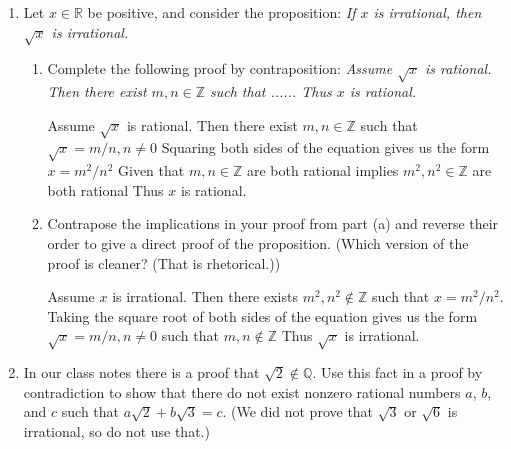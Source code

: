 \documentclass{article}
\newcommand{\bR}{\mathbb{R}}
\newcommand{\bQ}{\mathbb{Q}}
\newcommand{\bZ}{\mathbb{Z}}
\begin{document}
{\begin{enumerate}[labelindent=0pt,leftmargin=0pt]
\begin{enumerate}
Now we have the left side of the iff statement as the contrapositive of the tautology in the truth table from (a). Given that we have shown that the statement in part (a) is a tautology it must hold that. 

$((P\lor Q)\Rightarrow R)\Leftrightarrow ((P\Rightarrow R)\land(Q\Rightarrow R))$

is also a tautology.

\item Which of our proof methods does part (b) justify? How so? In
your answer, note why it is relevant that the main connective is ``if and
only if."

Part (b) uses logical equivalence witch implies proof by contraposition. If and only if implies A is universally true if and only if V is universally true. In proof by contraposition we then use the previous statement in the logical equivalence that A is universally false if and only if B is universally false. These two if and only if statements cover every possible outcome of A and B and justifies contraposition. 

\end{enumerate}
\item Let $x\in\bR$ be positive, and consider the proposition:
\textit{If $x$ is irrational, then $\sqrt{x}$ is irrational.}
\begin{enumerate}
\item Complete the following proof by contraposition: \textit{Assume
$\sqrt{x}$ is rational. Then there exist $m,n\in\bZ$ such that ...... Thus
$x$ is rational.}

Assume
$\sqrt{x}$ is rational. Then there exist $m,n\in\bZ$ such that 
$\sqrt{x} = m/n, n\neq0$ 
Squaring both sides of the equation gives us the form 
$x = m^2/n^2$ 
Given that $m,n\in\bZ$ are both rational implies 
$m^2,n^2\in\bZ$ are both rational 
Thus $x$ is rational. 

\item Contrapose the implications in your proof from part (a) and
reverse their order to give a direct proof of the proposition. (Which
version of the proof is cleaner? (That is rhetorical.))

Assume
$x$ is irrational. Then there exists $m^2,n^2\notin\bZ$ such that $x = m^2/n^2$.
Taking the square root of both sides of the equation gives us the form 
$\sqrt{x} = m/n, n\neq0$ such that $m,n\notin\bZ$ 
Thus $\sqrt{x}$ is irrational. 

\end{enumerate}
\item In our class notes there is a proof that $\sqrt{2}\not\in\bQ$.
Use this fact in a proof by contradiction to show that there do not exist
nonzero rational numbers $a$, $b$, and $c$ such that
$a\sqrt{2}+b\sqrt{3}=c$. (We did not prove that $\sqrt{3}$ or $\sqrt{6}$
is irrational, so do not use that.)


\end{enumerate}}
\end{document}
